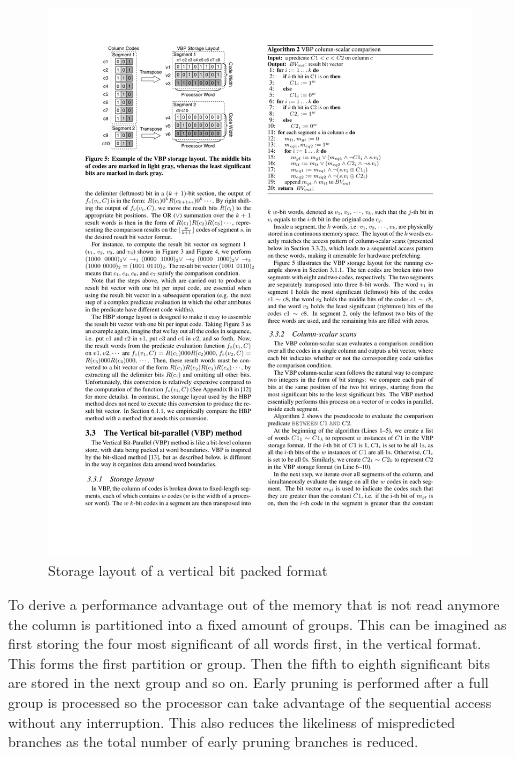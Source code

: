 \begin{figure}[h] \begin{center}
\includegraphics[scale=1.5]{images/bwv}
\end{center}
\caption{Storage layout of a vertical bit packed format~\cite{BitWeaving}}
\label{fig:bwv}
\end{figure}

To derive a performance advantage out of the memory that is not read anymore the
column is partitioned into a fixed amount of groups. This can be imagined as
first storing the four most significant of all words first, in the vertical
format. This forms the first partition or group. Then the fifth to eighth
significant bits are stored in the next group and so on. Early pruning is
performed after a full group is processed so the processor can take advantage of
the sequential access without any interruption. This also reduces the likeliness
of mispredicted branches as the total number of early pruning branches is
reduced.

